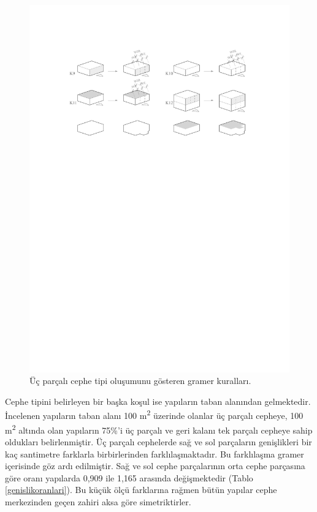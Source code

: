 \documentclass[12pt,turkish,a4paperpaper,]{report}
\begin{document}
\begin{figure}
\centering
\includegraphics[width=1\textwidth,height=\textheight]{source/figures/K9-K12.pdf}
\caption{Üç parçalı cephe tipi oluşumunu gösteren gramer kuralları.
\label{K9K12}}
\end{figure}

Cephe tipini belirleyen bir başka koşul ise yapıların taban alanından
gelmektedir. İncelenen yapıların taban alanı 100 m\textsuperscript{2}
üzerinde olanlar üç parçalı cepheye, 100 m\textsuperscript{2} altında
olan yapıların 75\%'i üç parçalı ve geri kalanı tek parçalı cepheye
sahip oldukları belirlenmiştir. Üç parçalı cephelerde sağ ve sol
parçaların genişlikleri bir kaç santimetre farklarla birbirlerinden
farklılaşmaktadır. Bu farklılaşma gramer içerisinde göz ardı edilmiştir.
Sağ ve sol cephe parçalarının orta cephe parçasına göre oranı yapılarda
0,909 ile 1,165 arasında değişmektedir (Tablo \ref{genislikoranlari}).
Bu küçük ölçü farklarına rağmen bütün yapılar cephe merkezinden geçen
zahiri aksa göre simetriktirler.
\end{document}
